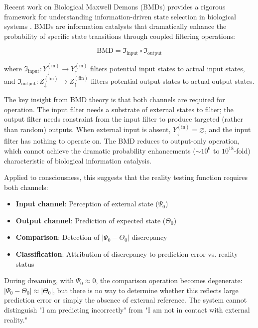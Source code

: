 \documentclass[11pt,a4paper]{article}
\begin{document}
Recent work on Biological Maxwell Demons (BMDs) provides a rigorous framework for understanding information-driven state selection in biological systems \cite{mizraji2021biological}. BMDs are information catalysts that dramatically enhance the probability of specific state transitions through coupled filtering operations:

\begin{equation}
\text{BMD} = \Im_{\text{input}} \circ \Im_{\text{output}}
\end{equation}

where $\Im_{\text{input}}: Y_{\downarrow}^{(\text{in})} \to Y_{\uparrow}^{(\text{in})}$ filters potential input states to actual input states, and $\Im_{\text{output}}: Z_{\downarrow}^{(\text{fin})} \to Z_{\uparrow}^{(\text{fin})}$ filters potential output states to actual output states.

The key insight from BMD theory is that both channels are required for operation. The input filter needs a substrate of external states to filter; the output filter needs constraint from the input filter to produce targeted (rather than random) outputs. When external input is absent, $Y_{\downarrow}^{(\text{in})} = \varnothing$, and the input filter has nothing to operate on. The BMD reduces to output-only operation, which cannot achieve the dramatic probability enhancements ($\sim 10^6$ to $10^{18}$-fold) characteristic of biological information catalysis.

Applied to consciousness, this suggests that the reality testing function requires both channels:

\begin{itemize}
\item \textbf{Input channel}: Perception of external state ($\Psi_0$)
\item \textbf{Output channel}: Prediction of expected state ($\Theta_0$)
\item \textbf{Comparison}: Detection of $|\Psi_0 - \Theta_0|$ discrepancy
\item \textbf{Classification}: Attribution of discrepancy to prediction error vs. reality status
\end{itemize}

During dreaming, with $\Psi_0 \approx 0$, the comparison operation becomes degenerate: $|\Psi_0 - \Theta_0| \approx |\Theta_0|$, but there is no way to determine whether this reflects large prediction error or simply the absence of external reference. The system cannot distinguish "I am predicting incorrectly" from "I am not in contact with external reality."
\end{document}
